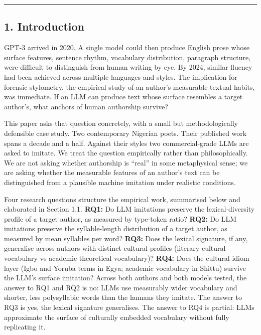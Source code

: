 \begin{center}\rule{0.5\linewidth}{0.5pt}\end{center}

\subsection{1. Introduction}\label{introduction}

GPT-3 arrived in 2020. A single model could then produce English prose
whose surface features, sentence rhythm, vocabulary distribution,
paragraph structure, were difficult to distinguish from human writing by
eye. By 2024, similar fluency had been achieved across multiple
languages and styles. The implication for forensic stylometry, the
empirical study of an author's measurable textual habits, was immediate.
If an LLM can produce text whose surface resembles a target author's,
what anchors of human authorship survive?

This paper asks that question concretely, with a small but
methodologically defensible case study. Two contemporary Nigerian poets.
Their published work spans a decade and a half. Against their styles two
commercial-grade LLMs are asked to imitate. We treat the question
empirically rather than philosophically. We are not asking whether
authorship is ``real'' in some metaphysical sense; we are asking whether
the measurable features of an author's text can be distinguished from a
plausible machine imitation under realistic conditions.

Four research questions structure the empirical work, summarised below
and elaborated in Section 1.1. \textbf{RQ1:} Do LLM imitations preserve
the lexical-diversity profile of a target author, as measured by
type-token ratio? \textbf{RQ2:} Do LLM imitations preserve the
syllable-length distribution of a target author, as measured by mean
syllables per word? \textbf{RQ3:} Does the lexical signature, if any,
generalise across authors with distinct cultural profiles
(literary-cultural vocabulary vs academic-theoretical vocabulary)?
\textbf{RQ4:} Does the cultural-idiom layer (Igbo and Yoruba terms in
Egya; academic vocabulary in Shittu) survive the LLM's surface
imitation? Across both authors and both models tested, the answer to RQ1
and RQ2 is no: LLMs use measurably wider vocabulary and shorter, less
polysyllabic words than the humans they imitate. The answer to RQ3 is
yes, the lexical signature generalises. The answer to RQ4 is partial:
LLMs approximate the surface of culturally embedded vocabulary without
fully replicating it.

